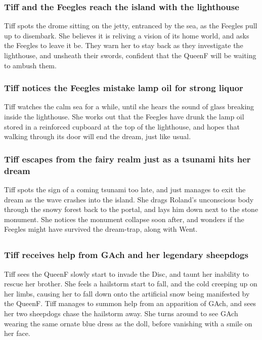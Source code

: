 \subsubsection{\Gls{Tiff} and the Feegles reach the island with the lighthouse}
\Gls{Tiff} spots the drome sitting on the jetty, entranced by the sea, as the Feegles pull up to
disembark. She believes it is reliving a vision of its home world, and asks the Feegles to leave it
be. They warn her to stay back as they investigate the lighthouse, and unsheath their swords,
confident that the \Gls{QueenF} will be waiting to ambush them.

\subsubsection{\Gls{Tiff} notices the Feegles mistake lamp oil for strong liquor}
\Gls{Tiff} watches the calm sea for a while, until she hears the sound of glass breaking inside the
lighthouse. She works out that the Feegles have drunk the lamp oil stored in a reinforced cupboard
at the top of the lighthouse, and hopes that walking through its door will end the dream, just like
usual.

\subsubsection{\Gls{Tiff} escapes from the fairy realm just as a tsunami hits her dream}
\Gls{Tiff} spots the sign of a coming tsunami too late, and just manages to exit the dream as the
wave crashes into the island. She drags \Gls{Roland}'s unconscious body through the snowy forest
back to the portal, and lays him down next to the stone monument. She notices the monument
collapse soon after, and wonders if the Feegles might have survived the dream-trap, along with
\Gls{Went}.

\subsection{}
\subsubsection{\Gls{Tiff} receives help from \Gls{GAch} and her legendary sheepdogs}
\Gls{Tiff} sees the \Gls{QueenF} slowly start to invade the Disc, and taunt her inability to
rescue her brother. She feels a hailstorm start to fall, and the cold creeping up on her limbs,
causing her to fall down onto the artificial snow being manifested by the \Gls{QueenF}. \Gls{Tiff}
manages to summon help from an apparition of \Gls{GAch}, and sees her two sheepdogs chase the
hailstorm away. She turns around to see \Gls{GAch} wearing the same ornate blue dress as the doll,
before vanishing with a smile on her face.

